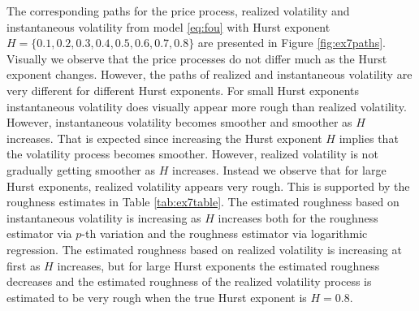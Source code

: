 \documentclass{article}
\begin{document}
The corresponding paths for the price process, realized volatility and instantaneous volatility from model \eqref{eq:fou} with Hurst exponent $H=\{0.1,0.2,0.3,0.4,0.5,0.6,0.7,0.8\}$ are presented in Figure \ref{fig:ex7paths}. Visually we observe that the price processes do not differ much as the Hurst exponent changes. However, the paths of realized and instantaneous volatility are very different for different Hurst exponents. For small Hurst exponents instantaneous volatility does visually appear more rough than realized volatility. However, instantaneous volatility becomes smoother and smoother as $H$ increases. That is expected since increasing the Hurst exponent $H$ implies that the volatility process becomes smoother. However, realized volatility is not gradually getting smoother as $H$ increases. Instead we observe that for large Hurst exponents, realized volatility appears very rough. This is supported by the roughness estimates in Table \ref{tab:ex7table}. The estimated roughness based on instantaneous volatility is increasing as $H$ increases both for the roughness estimator via $p$-th variation and the roughness estimator via logarithmic regression. The estimated roughness based on realized volatility is increasing at first as $H$ increases, but for large Hurst exponents the estimated roughness decreases and the estimated roughness of the realized volatility process is estimated to be very rough when the true Hurst exponent is $H=0.8$. 
\end{document}

